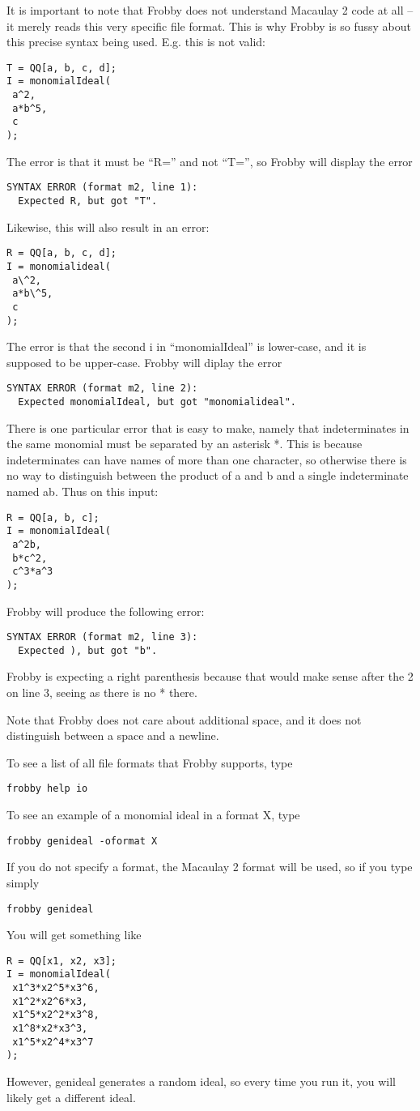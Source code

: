 \documentclass{amsart}
\theoremstyle{definition}
\begin{document}
It is important to note that Frobby does not understand Macaulay 2
code at all -- it merely reads this very specific file format. This is
why Frobby is so fussy about this precise syntax being used. E.g. this
is not valid:
\begin{verbatim}
T = QQ[a, b, c, d];
I = monomialIdeal(
 a^2,
 a*b^5,
 c
);
\end{verbatim}
The error is that it must be ``R='' and not ``T='', so Frobby will
display the error
\begin{verbatim}
SYNTAX ERROR (format m2, line 1):
  Expected R, but got "T".
\end{verbatim}
Likewise, this will also result in an error:
\begin{verbatim}
R = QQ[a, b, c, d];
I = monomialideal(
 a\^2,
 a*b\^5,
 c
);
\end{verbatim}
The error is that the second i in ``monomialIdeal'' is lower-case, and
it is supposed to be upper-case. Frobby will diplay the error
\begin{verbatim}
SYNTAX ERROR (format m2, line 2):
  Expected monomialIdeal, but got "monomialideal".
\end{verbatim}
There is one particular error that is easy to make, namely that
indeterminates in the same monomial must be separated by an asterisk
*. This is because indeterminates can have names of more than one
character, so otherwise there is no way to distinguish between the
product of a and b and a single indeterminate named ab. Thus on this
input:
\begin{verbatim}
R = QQ[a, b, c];
I = monomialIdeal(
 a^2b,
 b*c^2,
 c^3*a^3
);
\end{verbatim}
Frobby will produce the following error:
\begin{verbatim}
SYNTAX ERROR (format m2, line 3):
  Expected ), but got "b".
\end{verbatim}
Frobby is expecting a right parenthesis because that would make sense
after the 2 on line 3, seeing as there is no * there.

Note that Frobby does not care about additional space, and it does
not distinguish between a space and a newline.

To see a list of all file formats that Frobby supports, type
\begin{verbatim}
frobby help io
\end{verbatim}
To see an example of a monomial ideal in a format X, type
\begin{verbatim}
frobby genideal -oformat X
\end{verbatim}
If you do not specify a format, the Macaulay 2 format will be used, so
if you type simply
\begin{verbatim}
frobby genideal
\end{verbatim}
You will get something like
\begin{verbatim}
R = QQ[x1, x2, x3];
I = monomialIdeal(
 x1^3*x2^5*x3^6,
 x1^2*x2^6*x3,
 x1^5*x2^2*x3^8,
 x1^8*x2*x3^3,
 x1^5*x2^4*x3^7
);
\end{verbatim}
However, genideal generates a random ideal, so every time you run it,
you will likely get a different ideal.
\end{document}
